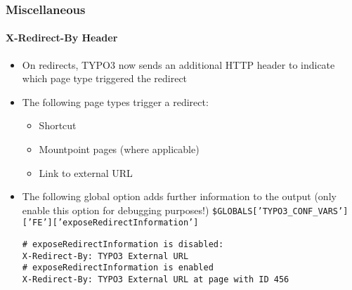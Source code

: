 %

\begin{frame}[fragile]
	\frametitle{Miscellaneous}
	\framesubtitle{X-Redirect-By Header}

	\lstset{basicstyle=\smaller\ttfamily}

	\begin{itemize}
		\item On redirects, TYPO3 now sends an additional HTTP header to indicate
			which page type triggered the redirect
		\item The following page types trigger a redirect:
			\begin{itemize}\smaller
				\item Shortcut
				\item Mountpoint pages (where applicable)
				\item Link to external URL
			\end{itemize}\normalsize
		\item The following global option adds further information to the output\newline
			\smaller(only enable this option for debugging purposes!)\normalsize
			\smaller\texttt{\$GLOBALS['TYPO3\_CONF\_VARS']['FE']['exposeRedirectInformation']}\normalsize
\begin{lstlisting}
# exposeRedirectInformation is disabled:
X-Redirect-By: TYPO3 External URL
# exposeRedirectInformation is enabled
X-Redirect-By: TYPO3 External URL at page with ID 456
\end{lstlisting}

	\end{itemize}

\end{frame}

